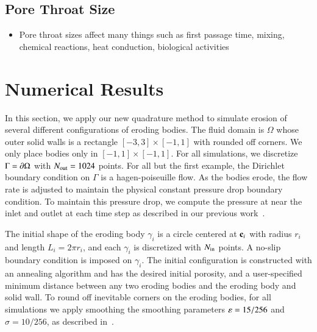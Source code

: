 \documentclass[preprint, 10pt]{elsarticle}
\begin{document}
\subsection{Pore Throat Size}
\begin{itemize}
  \item Pore throat sizes affect many things such as first passage time,
  mixing, chemical reactions, heat conduction, biological activities
\end{itemize}





\section{Numerical Results}
\label{s:results}
In this section, we apply our new quadrature method to simulate erosion
of several different configurations of eroding bodies.  The fluid domain
is $\Omega$ whose outer solid walls is a rectangle $[-3,3] \times
[-1,1]$ with rounded off corners.  We only place bodies only in $[-1,1]
\times [-1,1]$.  For all simulations, we discretize $\Gamma = {\partial}
\Omega$ with $N_{\mathrm{out}}=1024$ points.  For all but the first example, the
Dirichlet boundary condition on $\Gamma$ is a hagen-poiseuille flow.  As
the bodies erode, the flow rate is adjusted to maintain the physical
constant pressure drop boundary condition.  To maintain this pressure
drop, we compute the pressure at near the inlet and outlet at each time
step as described in our previous work~\cite{qua-moo2018}.

The initial shape of the eroding body $\gamma_i$ is a circle centered at
${\mathbf{c}}_i$ with radius $r_i$ and length $L_i = 2\pi r_i$, and each
$\gamma_i$ is discretized with $N_{\mathrm{in}}$ points.  A no-slip boundary
condition is imposed on $\gamma_i$.  The initial configuration is
constructed with an annealing algorithm and has the desired initial
porosity, and a user-specified minimum distance between any two eroding
bodies and the eroding body and solid wall.  To round off inevitable
corners on the eroding bodies, for all simulations we apply smoothing
the smoothing parameters $\varepsilon=15/256$ and $\sigma=10/256$, as described
in~\cite{qua-moo2018}.  
\end{document}
